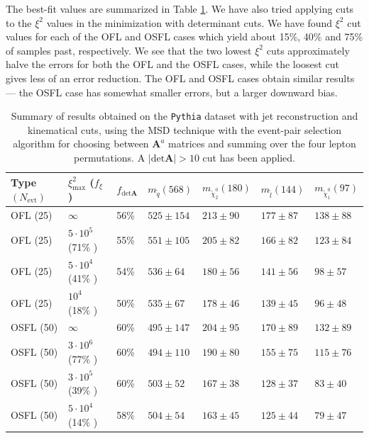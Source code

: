 \documentclass[twoside,english]{uiofysmaster}
\begin{document}
The best-fit values are summarized in Table \ref{table:table_jetrec}. We have also tried applying cuts to the $\xi^2$ values in the minimization with determinant cuts. We have found $\xi^2$ cut values for each of the OFL and OSFL cases which yield about 15\%, 40\% and 75\% of samples past, respectively. We see that the two lowest $\xi^2$ cuts approximately halve the errors for both the OFL and the OSFL cases, while the loosest cut gives less of an error reduction. The OFL and OSFL cases obtain similar results --- the OSFL case has somewhat smaller errors, but a larger downward bias.
\begin{table}[hbt]
	\small
	\centering
	\begin{tabular}{| l | l | l || l | l | l | l |}
		\hline
		Type $(N_\mathrm{evt})$ & $\xi^2_\mathrm{max}$ ($f_\xi$) & $f_{\mathrm{det}\mathbf A}$ & $m_{\tilde q} (568)$ & $m_{\tilde \chi_2^0} (180)$ & $m_{\tilde l} (144)$ & $m_{\tilde \chi_1^0} (97)$ \\
		\hline \hline
		OFL (25) 	& 	$\infty$ 				& 56\%		&  $525 \pm 154$	&	$213\pm90$	&	$177\pm87$	& 	$138\pm88$	\\
    OFL (25)  &   $5\cdot10^5$ (71\% )  & 55\%    & $551\pm105$ & $205\pm82$  & $166\pm82$  &   $123\pm84$  \\
    OFL (25)  &   $5\cdot10^4$ (41\% )  & 54\%    & $536\pm64$  & $180\pm56$  & $141\pm56$  &   $98\pm57$ \\
		OFL (25) 	& 	$10^4$ (18\% ) 		& 50\% 	& $535\pm67$	&	$178\pm46$	&	$139\pm45$	& 	$96\pm48$	\\
		OSFL (50) 	& 	$\infty$ 				& 60\%		& $495\pm147$	&	$204\pm95$	&	$170\pm89$	& 	$132\pm89$	\\
    OSFL (50)   &   $3\cdot10^6$ (77\% )  & 60\%    & $494\pm110$ & $190\pm80$  & $155\pm75$  &   $115\pm76$  \\
		OSFL (50) 	& 	$3\cdot10^5$ (39\% ) 	& 60\%		& $503\pm52$	&	$167\pm38$	&	$128\pm37$	& 	$83\pm40$	\\
    OSFL (50)   &   $5\cdot10^4$ (14\% )  & 58\%    & $504\pm54$  & $163\pm45$  & $125\pm44$  &   $79\pm47$ \\
		\hline
	\end{tabular}
	\caption{Summary of results obtained on the {\tt Pythia} dataset with jet reconstruction and kinematical cuts, using the MSD technique with the event-pair selection algorithm for choosing between $\mathbf A^a$ matrices and summing over the four lepton permutations. A $|\mathrm{det}\mathbf A|>10$ cut has been applied.}
	\label{table:table_jetrec}
\end{table}
\end{document}
